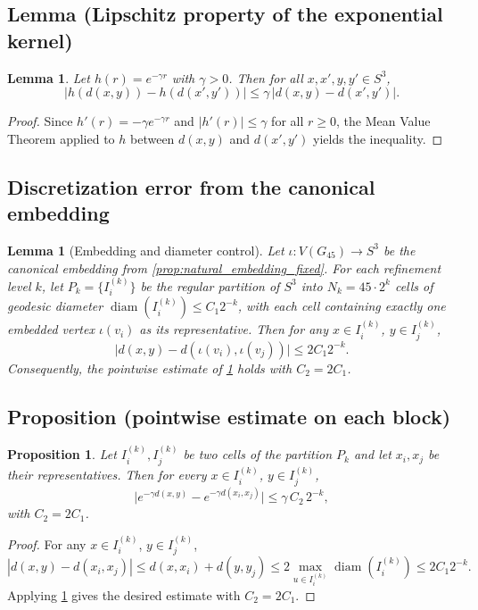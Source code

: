 \documentclass[12pt]{article}
\newtheorem{lemma}[theorem]{Lemma}
\newtheorem{proposition}[theorem]{Proposition}
\numberwithin{equation}{section}
\begin{document}
\subsection{Lemma (Lipschitz property of the exponential kernel)}

\begin{lemma}\label{lem:lipschitz}
Let \(h(r) = e^{-\gamma r}\) with \(\gamma > 0\). Then for all \(x, x', y, y' \in S^3\),
\[
\big| h(d(x,y)) - h(d(x',y')) \big| \le \gamma \, \big| d(x,y) - d(x',y') \big|.
\]
\end{lemma}
\begin{proof}
Since \(h'(r) = -\gamma e^{-\gamma r}\) and \(|h'(r)| \le \gamma\) for all \(r \ge 0\), the Mean Value Theorem applied to \(h\) between \(d(x,y)\) and \(d(x',y')\) yields the inequality.
\end{proof}

\subsection{Discretization error from the canonical embedding}

\begin{lemma}[Embedding and diameter control]
\label{lem:embedding_error}
Let \(\iota: V(G_{45}) \to S^3\) be the canonical embedding from \cref{prop:natural_embedding_fixed}.  
For each refinement level \(k\), let \(P_k = \{I_i^{(k)}\}\) be the regular partition of \(S^3\) into \(N_k = 45\cdot 2^k\) cells of geodesic diameter \(\operatorname{diam}(I_i^{(k)}) \le C_1 2^{-k}\), with each cell containing exactly one embedded vertex \(\iota(v_i)\) as its representative.  
Then for any \(x \in I_i^{(k)}\), \(y \in I_j^{(k)}\),
\[
\big| d(x,y) - d(\iota(v_i), \iota(v_j)) \big| \le 2C_1 2^{-k}.
\]
Consequently, the pointwise estimate of \cref{prop:pointwise} holds with \(C_2 = 2C_1\).
\end{lemma}

\subsection{Proposition (pointwise estimate on each block)}

\begin{proposition}\label{prop:pointwise}
Let \(I_i^{(k)}, I_j^{(k)}\) be two cells of the partition \(P_k\) and let \(x_i, x_j\) be their representatives. Then for every \(x \in I_i^{(k)}\), \(y \in I_j^{(k)}\),
\[
\big| e^{-\gamma d(x,y)} - e^{-\gamma d(x_i, x_j)} \big| \le \gamma \, C_2 \, 2^{-k},
\]
with \(C_2 = 2C_1\).
\end{proposition}
\begin{proof}
For any \(x \in I_i^{(k)}\), \(y \in I_j^{(k)}\),
\[
|d(x,y) - d(x_i, x_j)| \le d(x, x_i) + d(y, y_j) \le 2 \max_{u \in I_i^{(k)}} \operatorname{diam}(I_i^{(k)}) \le 2C_1 2^{-k}.
\]
Applying \cref{lem:lipschitz} gives the desired estimate with \(C_2 = 2C_1\).
\end{proof}
\end{document}
